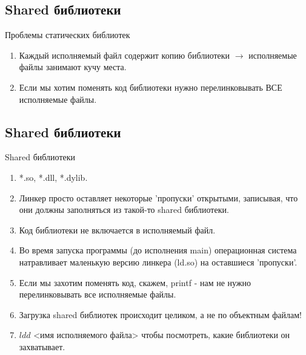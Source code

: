 \documentclass[10pt]{beamer}
\begin{document}
\subsection{Shared библиотеки}
\begin{frame}{Проблемы статических библиотек}
\begin{enumerate}
\item Каждый исполняемый файл содержит копию библиотеки $\rightarrow$ исполняемые файлы занимают кучу места.
\item Если мы хотим поменять код библиотеки нужно перелинковывать ВСЕ исполняемые файлы.
\end{enumerate}
\end{frame}

\subsection{Shared библиотеки}
\begin{frame}{Shared библиотеки}
\begin{enumerate}
\item *.so, *.dll, *.dylib.
\item Линкер просто оставляет некоторые 'пропуски' открытыми, записывая, что они должны заполняться из такой-то shared библиотеки.
\item Код библиотеки не включается в исполняемый файл.
\item Во время запуска программы (до исполнения main) операционная система натравливает маленькую версию линкера (ld.so) на оставшиеся 'пропуски'.
\item Если мы захотим поменять код, скажем, printf - нам не нужно перелинковывать все исполняемые файлы. 
\item Загрузка shared библиотек происходит целиком, а не по объектным файлам!
\item $ldd$ <имя исполняемого файла> чтобы посмотреть, какие библиотеки он захватывает.
\end{enumerate}
\end{frame}
\end{document}

